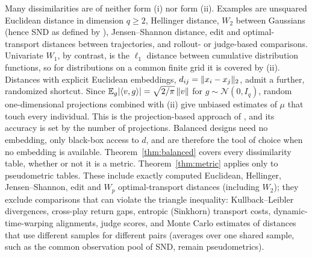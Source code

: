 \begin{remark}
Many dissimilarities are of neither form (i) nor form (ii). Examples are unsquared
Euclidean distance in dimension $q\ge2$, Hellinger distance, $W_2$ between
Gaussians (hence SND as defined by \citealt{bettini2025snd}), Jensen--Shannon
distance, edit and optimal-transport distances between trajectories, and
rollout- or judge-based comparisons. Univariate $W_1$, by contrast, is the
$\ell_1$ distance between cumulative distribution functions, so for
distributions on a common finite grid it is covered by (ii). Distances with explicit Euclidean
embeddings, $d_{ij}=\lVert x_i-x_j\rVert_2$, admit a further, randomized shortcut. Since
$\mathbb{E}_g\lvert\langle v,g\rangle\rvert=\sqrt{2/\pi}\,\lVert v\rVert$ for $g\sim\mathcal N(0,I_q)$, random
one-dimensional projections combined with (ii) give unbiased estimates of $\mu$
that touch every individual. This is the projection-based approach of
\citet{barhum2007approximating}, and its accuracy is set by the number of
projections. Balanced designs need no embedding, only black-box access to $d$,
and are therefore the tool of choice when no embedding is available.
Theorem~\ref{thm:balanced} covers every dissimilarity table, whether or not it is
a metric. Theorem~\ref{thm:metric} applies only to pseudometric tables. These
include exactly computed Euclidean, Hellinger, Jensen--Shannon, edit and
$W_p$ optimal-transport distances (including $W_2$); they exclude comparisons that can violate the
triangle inequality: Kullback--Leibler divergences, cross-play return gaps, entropic (Sinkhorn)
transport costs, dynamic-time-warping alignments, judge scores, and Monte Carlo
estimates of distances that use different samples for different pairs (averages over one shared sample, such as the common observation pool of SND, remain pseudometrics).
\end{remark}

